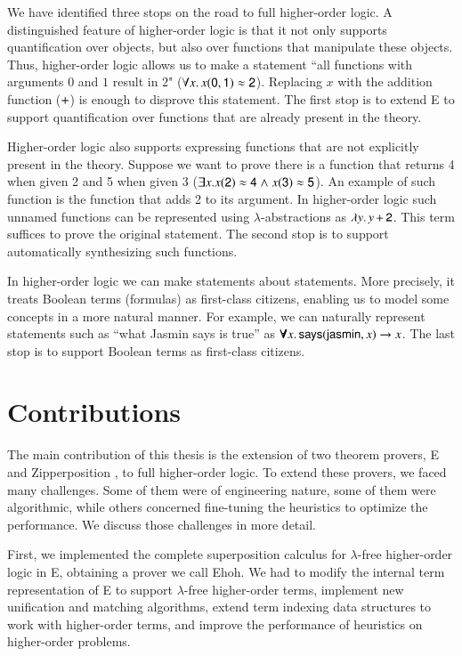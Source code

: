 We have identified three stops on the road to full higher-order logic. A
distinguished feature of higher-order logic is that it not only supports
quantification over objects, but also over functions that manipulate these
objects. Thus, higher-order logic allows us to make a statement ``all functions
with arguments $0$ and $1$ result in $2$" ($\forall x. \,  x (\mathsf{0}, \mathsf{1}) \approx
\mathsf{2}$). Replacing $x$ with the addition function ($\mathsf{+}$) is enough to
disprove this statement. The first stop is to extend E to support
quantification over functions that are already present in the theory.

Higher-order logic also supports expressing functions that are not explicitly
present in the theory. Suppose we want to prove there is a
function that returns 4 when given 2 and 5 when given 3 ($\exists x. x(\mathsf{2})
\approx \mathsf{4} \mathrel\land x (\mathsf{3}) \approx \mathsf{5} $). An example of such function is
the function that adds 2 to its argument. In higher-order logic such unnamed
functions can be represented using $\lambda$-abstractions as $\lambda y.\, y \,
\mathsf{+} \, \mathsf{2}$. This term suffices to prove the original statement. The
second stop is to support automatically synthesizing such functions.

In higher-order logic we can make statements about statements. More precisely,
it treats Boolean terms (formulas) as first-class citizens, enabling us to
model some concepts in a more natural manner. For example, we can naturally
represent statements such as ``what Jasmin says is true'' as $\pmb{\forall} x. \,
\mathsf{says}(\mathsf{jasmin}, x) \rightarrow x$. The last stop is to support Boolean terms
as first-class citizens.
\pagebreak[2]

\section{Contributions}

The main contribution of this thesis is the extension of two theorem provers,
E and Zipperposition \cite{sc-15-simon-phd}, to full higher-order logic. To
extend these provers, we faced many challenges. Some of them were of engineering
nature, some of them were algorithmic, while others concerned fine-tuning the
heuristics to optimize the performance. We discuss those challenges in more detail.

  
  First, we implemented the complete superposition calculus for $\lambda$-free
  higher-order logic \cite{bbcw-21-lfho} in E, obtaining a prover we call Ehoh.
  We had to modify the internal term representation of E to support $\lambda$-free
  higher-order terms, implement new unification and matching algorithms, extend
  term indexing data structures to work with higher-order terms, and improve the
  performance of heuristics on higher-order problems.
  
